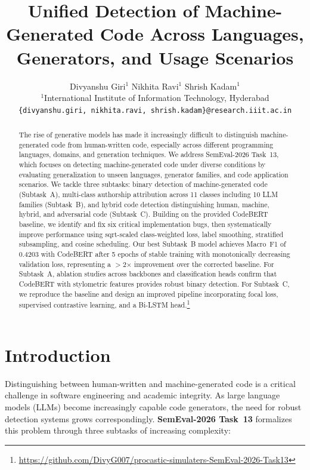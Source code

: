 \documentclass[11pt]{article}
\title{Unified Detection of Machine-Generated
Code Across Languages, Generators, and
Usage Scenarios}
\author{
  Divyanshu Giri$^1$ \quad Nikhita Ravi$^1$ \quad Shrish Kadam$^1$ \\
  $^1$International Institute of Information Technology, Hyderabad \\
  \texttt{\{divyanshu.giri, nikhita.ravi, shrish.kadam\}@research.iiit.ac.in}
}
\begin{document}
\maketitle
\begin{abstract}
The rise of generative models has made it increasingly difficult to distinguish machine-generated code from human-written code, especially across different programming languages, domains, and generation techniques. We address SemEval-2026 Task~13, which focuses on detecting machine-generated code under diverse conditions by evaluating generalization to unseen languages, generator families, and code application scenarios. We tackle three subtasks: binary detection of machine-generated code (Subtask~A), multi-class authorship attribution across 11 classes including 10 LLM families (Subtask~B), and hybrid code detection distinguishing human, machine, hybrid, and adversarial code (Subtask~C). Building on the provided CodeBERT baseline, we identify and fix six critical implementation bugs, then systematically improve performance using sqrt-scaled class-weighted loss, label smoothing, stratified subsampling, and cosine scheduling. Our best Subtask~B model achieves Macro~F1 of 0.4203 with CodeBERT after 5 epochs of stable training with monotonically decreasing validation loss, representing a $>$2$\times$ improvement over the corrected baseline. For Subtask~A, ablation studies across backbones and classification heads confirm that CodeBERT with stylometric features provides robust binary detection. For Subtask~C, we reproduce the baseline and design an improved pipeline incorporating focal loss, supervised contrastive learning, and a Bi-LSTM head.\footnote{\url{https://github.com/DivyG007/procastic-simulaters-SemEval-2026-Task13}}
\end{abstract}

\section{Introduction}
\label{sec:intro}

Distinguishing between human-written and machine-generated code is a critical challenge in software engineering and academic integrity. As large language models (LLMs) become increasingly capable code generators, the need for robust detection systems grows correspondingly. \textbf{SemEval-2026 Task~13} \cite{orel-etal-2025-codet} formalizes this problem through three subtasks of increasing complexity:
\end{document}
